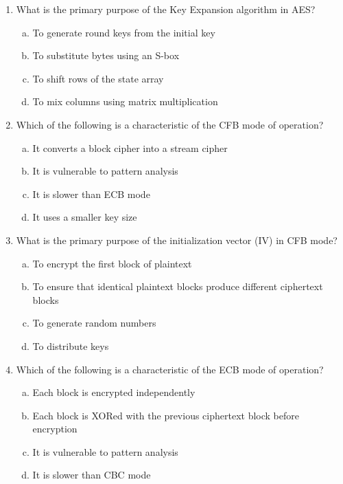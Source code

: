 \documentclass[12pt]{article}
\begin{document}
\begin{enumerate}
    \item What is the primary purpose of the Key Expansion algorithm in AES?
    \begin{enumerate}[(a)]
        \item To generate round keys from the initial key
        \item To substitute bytes using an S-box
        \item To shift rows of the state array
        \item To mix columns using matrix multiplication
    \end{enumerate}
\newpage
    \item Which of the following is a characteristic of the CFB mode of operation?
    \begin{enumerate}[(a)]
        \item It converts a block cipher into a stream cipher
        \item It is vulnerable to pattern analysis
        \item It is slower than ECB mode
        \item It uses a smaller key size
    \end{enumerate}

    \item What is the primary purpose of the initialization vector (IV) in CFB mode?
    \begin{enumerate}[(a)]
        \item To encrypt the first block of plaintext
        \item To ensure that identical plaintext blocks produce different ciphertext blocks
        \item To generate random numbers
        \item To distribute keys
    \end{enumerate}

    \item Which of the following is a characteristic of the ECB mode of operation?
    \begin{enumerate}[(a)]
        \item Each block is encrypted independently
        \item Each block is XORed with the previous ciphertext block before encryption
        \item It is vulnerable to pattern analysis
        \item It is slower than CBC mode
    \end{enumerate}


\end{enumerate}
\end{document}
